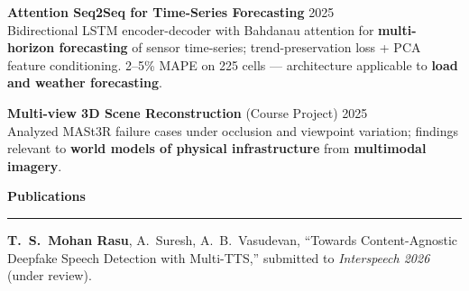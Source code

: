 \documentclass[9pt]{article}
\newcommand{\sect}[1]{\vspace{4pt}\noindent\textbf{\large #1}\vspace{3pt}\hrule\vspace{6pt}}
\begin{document}
\textbf{Attention Seq2Seq for Time-Series Forecasting} \hfill 2025\\
Bidirectional LSTM encoder-decoder with Bahdanau attention for \textbf{multi-horizon forecasting} of sensor time-series; trend-preservation loss + PCA feature conditioning. 2--5\% MAPE on 225 cells --- architecture applicable to \textbf{load and weather forecasting}.

\textbf{Multi-view 3D Scene Reconstruction} (Course Project) \hfill 2025\\
Analyzed MASt3R failure cases under occlusion and viewpoint variation; findings relevant to \textbf{world models of physical infrastructure} from \textbf{multimodal imagery}.

\sect{Publications}
\textbf{T.\ S.\ Mohan Rasu}, A.\ Suresh, A.\ B.\ Vasudevan, ``Towards Content-Agnostic Deepfake Speech Detection with Multi-TTS,'' submitted to \emph{Interspeech 2026} (under review).
\end{document}
